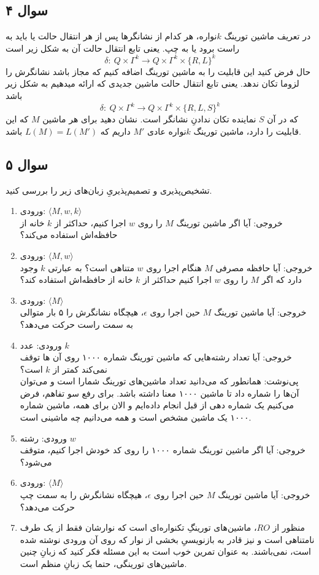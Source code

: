 \documentclass{scribe-or}
\begin{document}
\subsection*{ سوال ۴}
در تعریف ماشین تورینگ $k$نواره، هر کدام از نشانگرها پس از هر انتقال حالت یا باید به راست برود یا به چپ. یعنی تابع انتقال حالت آن به شکل زیر است
$$\delta: \ Q\times \Gamma^k \rightarrow Q\times \Gamma^k \times \{R,L\}^k$$
حال فرض کنید این قابلیت را به ماشین تورینگ اضافه کنیم که مجاز باشد نشانگرش را لزوما تکان ندهد. یعنی تابع انتقال حالت ماشین جدیدی که ارائه میدهیم به شکل زیر باشد
$$\delta: \ Q\times \Gamma^k \rightarrow Q\times \Gamma^k \times \{R,L,S\}^k$$
که در آن $S$ نماینده تکان ندادنِ نشانگر است. نشان دهید برای هر ماشین $M$ که این قابلیت را دارد، ماشین تورینگ $k$نواره عادی $M'$ داریم که $L(M)=L(M')$ باشد.
\subsection*{ سوال ۵}
تشخیص‌پذیری و تصمیم‌پذیریِ زبان‌های زیر را بررسی کنید.
\begin{enumerate}
\item 
ورودی: $\langle M,w,k\rangle$\\
خروجی: آیا اگر ماشین تورینگ $M$ را روی $w$ اجرا کنیم، حداکثر از $k$ خانه از حافظه‌اش استفاده می‌کند؟
\item 
ورودی: $\langle M,w\rangle$\\
خروجی: آیا حافظه مصرفی $M$ هنگام اجرا روی $w$ متناهی است؟ به عبارتی $k$ وجود دارد که اگر $M$ را روی $w$ اجرا کنیم حداکثر از $k$ خانه از حافظه‌اش استفاده کند؟
\item 
ورودی: $\langle M\rangle$\\
خروجی: آیا ماشین تورینگ $M$ حین اجرا روی $\epsilon$، هیچگاه نشانگرش را ۵ بار متوالی به سمت راست حرکت می‌دهد؟
\item 
ورودی: عدد $k$\\
خروجی: آیا تعداد رشته‌هایی که ماشین تورینگ شماره ١٠٠٠ روی آن ها توقف نمی‌کند کمتر از $k$ است؟\\[1em]
پی‌نوشت: همانطور که می‌دانید تعداد ماشین‌های تورینگ شمارا است و می‌توان آن‌ها را شماره داد تا ماشین ۱۰۰۰ معنا داشته باشد. برای رفع سو تفاهم، فرض می‌کنیم یک شماره دهی از قبل انجام داده‌ایم و الان برای همه، ماشین شماره ۱۰۰۰ یک ماشین مشخص است و همه می‌دانیم چه ماشینی است.
\item 
ورودی: رشته $w$\\
خروجی: آیا اگر ماشین تورینگ شماره ١٠٠٠ را روی کد خودش اجرا کنیم، متوقف می‌شود؟
\item
ورودی: $\langle M\rangle$\\
خروجی: آیا ماشین تورینگ $M$ حین اجرا روی $\epsilon$، هیچگاه نشانگرش را به سمت چپ حرکت می‌دهد؟
\item 

منظور از $RO$، ماشین‌های تورینگِ تکنواره‌ای است که نوارشان فقط از یک طرف نامتناهی است و نیز قادر به بازنویسیِ بخشی از نوار که روی آن ورودی نوشته شده است، نمی‌باشند. به عنوان تمرین خوب است به این مسئله فکر کنید که زبانِ چنین ماشین‌های تورینگی، حتما یک زبانِ منظم است.
\end{enumerate}
\end{document}
